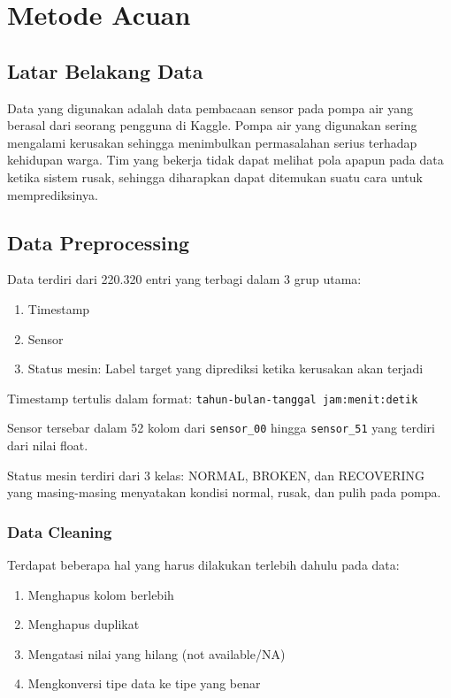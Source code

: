 \chapter{Metode Acuan}

\section{Latar Belakang Data}

Data yang digunakan adalah data pembacaan sensor pada pompa air yang berasal dari seorang pengguna di Kaggle. Pompa air yang digunakan sering mengalami kerusakan sehingga menimbulkan permasalahan serius terhadap kehidupan warga. Tim yang bekerja tidak dapat melihat pola apapun pada data ketika sistem rusak, sehingga diharapkan dapat ditemukan suatu cara untuk memprediksinya.


\section{Data Preprocessing}

Data terdiri dari 220.320 entri yang terbagi dalam 3 grup utama:

\begin{enumerate}
    \item Timestamp
    \item Sensor
    \item Status mesin: Label target yang diprediksi ketika kerusakan akan terjadi
\end{enumerate}

Timestamp tertulis dalam format: \texttt{tahun-bulan-tanggal jam:menit:detik}

Sensor tersebar dalam 52 kolom dari \texttt{sensor\_00} hingga \texttt{sensor\_51} yang terdiri dari nilai float.

Status mesin terdiri dari 3 kelas: NORMAL, BROKEN, dan RECOVERING yang masing-masing menyatakan kondisi normal, rusak, dan pulih pada pompa.

    \subsection{Data Cleaning}

    Terdapat beberapa hal yang harus dilakukan terlebih dahulu pada data:

    \begin{enumerate}
        \item Menghapus kolom berlebih
        \item Menghapus duplikat
        \item Mengatasi nilai yang hilang (not available/NA)
        \item Mengkonversi tipe data ke tipe yang benar
    \end{enumerate}
    

